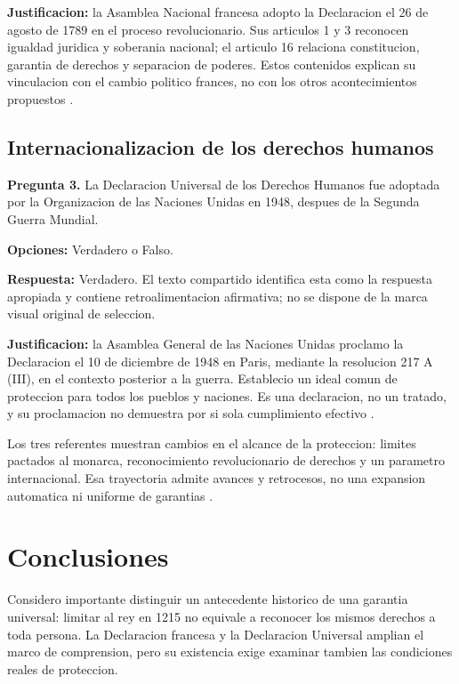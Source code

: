 \documentclass[spanish,letterpaper,oneside]{article}
\begin{document}
\textbf{Justificacion:} la Asamblea Nacional francesa adopto la
Declaracion el 26 de agosto de 1789 en el proceso revolucionario.
Sus articulos 1 y 3 reconocen igualdad juridica y soberania nacional;
el articulo 16 relaciona constitucion, garantia de derechos y separacion
de poderes. Estos contenidos explican su vinculacion con el cambio
politico frances, no con los otros acontecimientos propuestos
\citep[arts.~1, 3 y 16]{declaracionFrancia1789ADH}.

\subsection{Internacionalizacion de los derechos humanos}
\textbf{Pregunta 3.} La Declaracion Universal de los Derechos Humanos
fue adoptada por la Organizacion de las Naciones Unidas en 1948,
despues de la Segunda Guerra Mundial.

\textbf{Opciones:} Verdadero o Falso.

\textbf{Respuesta:} Verdadero. El texto compartido identifica esta
como la respuesta apropiada y contiene retroalimentacion afirmativa;
no se dispone de la marca visual original de seleccion.

\textbf{Justificacion:} la Asamblea General de las Naciones Unidas
proclamo la Declaracion el 10 de diciembre de 1948 en Paris, mediante
la resolucion 217 A (III), en el contexto posterior a la guerra.
Establecio un ideal comun de proteccion para todos los pueblos y
naciones. Es una declaracion, no un tratado, y su proclamacion no
demuestra por si sola cumplimiento efectivo \citep{onuDeclaracion1948ADH}.

Los tres referentes muestran cambios en el alcance de la proteccion:
limites pactados al monarca, reconocimiento revolucionario de derechos
y un parametro internacional. Esa trayectoria admite avances y
retrocesos, no una expansion automatica ni uniforme de garantias
\citep[p.~11]{alvarezIcaza2009ADH}\citep{unedVideo2024}.

\clearpage
\section{Conclusiones}
Considero importante distinguir un antecedente historico de una garantia
universal: limitar al rey en 1215 no equivale a reconocer los mismos
derechos a toda persona. La Declaracion francesa y la Declaracion
Universal amplian el marco de comprension, pero su existencia exige
examinar tambien las condiciones reales de proteccion.
\end{document}
